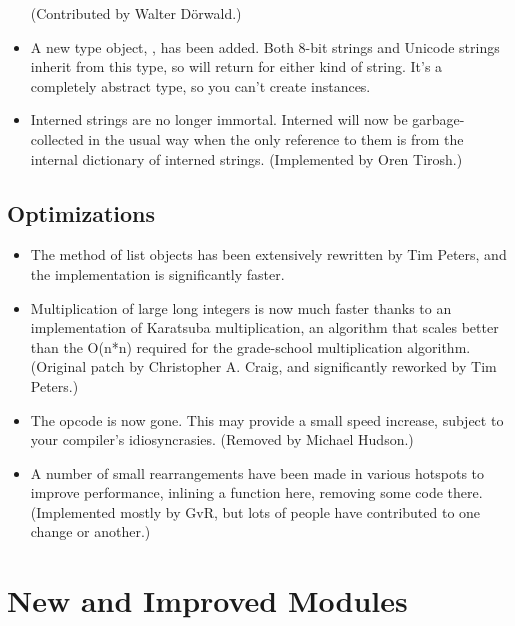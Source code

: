 \documentclass{howto}
\begin{document}
\begin{itemize}
(Contributed by Walter D\"orwald.)

\item A new type object, , has been added.  
   Both 8-bit strings and Unicode strings inherit from this type, so
    will return  for
   either kind of string.  It's a completely abstract type, so you
   can't create  instances.

\item Interned strings are no longer immortal.  Interned will now be
garbage-collected in the usual way when the only reference to them is
from the internal dictionary of interned strings.  (Implemented by
Oren Tirosh.)

\end{itemize}


\subsection{Optimizations}

\begin{itemize}

\item The  method of list objects has been extensively
rewritten by Tim Peters, and the implementation is significantly
faster.

\item Multiplication of large long integers is now much faster thanks
to an implementation of Karatsuba multiplication, an algorithm that
scales better than the O(n*n) required for the grade-school
multiplication algorithm.  (Original patch by Christopher A. Craig,
and significantly reworked by Tim Peters.)

\item The  opcode is now gone.  This may provide a
small speed increase, subject to your compiler's idiosyncrasies.
(Removed by Michael Hudson.)

\item A number of small rearrangements have been made in various
hotspots to improve performance, inlining a function here, removing
some code there.  (Implemented mostly by GvR, but lots of people have
contributed to one change or another.)

\end{itemize}


\section{New and Improved Modules}
\end{document}
